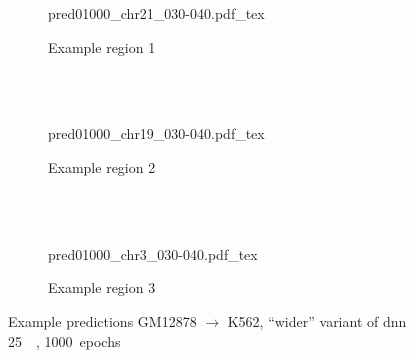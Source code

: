 \begin{figure}[p]
    \begin{subfigure}{\textwidth}
        \centering
        \scriptsize
        {pred01000_chr21_030-040.pdf_tex}
        \caption{Example  region 1} \label{fig:results:wider_r1}
    \end{subfigure}\\[2mm]
    \\[3mm]
    \begin{subfigure}{\textwidth}
        \centering
        \scriptsize
        {pred01000_chr19_030-040.pdf_tex}
        \caption{Example region 2} \label{fig:results:wider_r2}
    \end{subfigure}\\[2mm]
    \\[3mm]
    \begin{subfigure}{\textwidth}
        \centering
        \scriptsize
        {pred01000_chr3_030-040.pdf_tex}
        \caption{Example region 3} \label{fig:results:wider_r3}
    \end{subfigure}
    \caption{Example predictions GM12878 $\rightarrow$ K562, ``wider'' variant of \acrshort{dnn} \SI{25}{\kilo\bp}, 1000~epochs}\label{fig:results:wider_matrices}
\end{figure}

